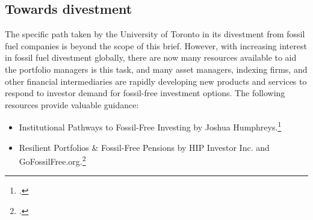 		\subsection{Towards divestment}



The specific path taken by the University of Toronto in its divestment from fossil fuel companies is beyond the scope of this brief.
However, with increasing interest in fossil fuel divestment globally, there are now many resources available to aid the portfolio managers is this task, and many asset managers, indexing firms, and other financial intermediaries are rapidly developing new products and services to respond to investor demand for fossil-free investment options.
The following resources provide valuable guidance:
\begin{itemize}
	\item Institutional Pathways to Fossil-Free Investing by Joshua Humphreys.\footcite[][]{FossilFreeInvesting}
	\item Resilient Portfolios \& Fossil-Free Pensions by HIP Investor Inc. and GoFossilFree.org.\footcite[][]{ResPortFFPensions}
\end{itemize}



